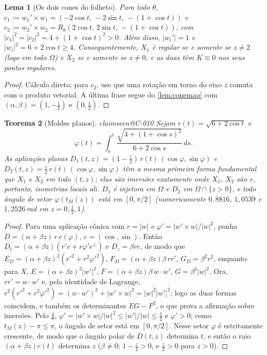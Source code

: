 \documentclass[11pt,a4paper]{article}
\makeatletter
\theoremstyle{plain}
\newtheorem{theorem}{Teorema}[section]
\newtheorem{lemma}[theorem]{Lema}
\theoremstyle{remark}
\newcommand{\claim}[1]{\ifcsname claimseen@#1\endcsname\else\expandafter\gdef\csname claimseen@#1\endcsname{}\label{claim:#1}\fi}
\makeatother
\begin{document}
\begin{lemma}[Os dois cones do folheto]\label{lem:leafcones}
Para todo $\theta$, $c_1:=w_1'\times w_1=(-2\cos t,\,-2\sin t,\,-(1+\cos t))$ e
$c_2:=w_2'\times w_2=R_\theta(2\cos t,\,2\sin t,\,-(1+\cos t))$, com $|c_1|^2=|c_2|^2=4+(1+\cos t)^2>0$. Além disso,
$|w_i'|=1$ e $|w_i|^2=6+2\cos t\ge4$. Consequentemente, $X_1$ é regular se e somente se $z\ne2$ (logo em todo $\Omega$) e $X_2$
se e somente se $z\ne0$, e as duas têm $K\equiv0$ nos seus pontos regulares.
\end{lemma}
\begin{proof}
Cálculo direto; para $c_2$, use que uma rotação em torno do eixo $z$ comuta com o produto vetorial. A última frase segue do
\cref{lem:conemap} com $(\alpha,\beta)=(1,-\frac12)$ e $(0,\frac12)$.
\end{proof}

\begin{theorem}[Moldes planos]\label{thm:flat}\claim{C-010}
Sejam $r(t)=\sqrt{6+2\cos t}$ e
\[ \varphi(t)=\int_\pi^t\frac{\sqrt{4+(1+\cos s)^2}}{6+2\cos s}\,ds. \]
As aplicações planas $D_1(t,z)=(1-\tfrac z2)\,r(t)\,(\cos\varphi,\sin\varphi)$ e $D_2(t,z)=\tfrac z2\,r(t)\,(\cos\varphi,\sin\varphi)$
têm a mesma primeira forma fundamental que $X_1$ e $X_2$ em todo $(t,z)$; elas são imersões exatamente onde $X_1$, $X_2$ são
e, portanto, isometrias locais ali. $D_1$ é injetora em $\Omega$ e $D_2$ em $\Omega\cap\{z>0\}$, e todo ângulo de setor
$\varphi(t_M(z))$ está em $[0,\pi/2]$ (numericamente $0{,}8816$, $1{,}0539$ e $1{,}2526$\,rad em $z=0,\tfrac12,1$).
\end{theorem}
\begin{proof}
Para uma aplicação cônica com $r=|w|$ e $\varphi'=|w'\times w|/|w|^2$, ponha $D=(\alpha+\beta z)\,r\,e(\varphi)$,
$e=(\cos,\sin)$. Então $D_t=(\alpha+\beta z)(r'e+r\varphi'e^\perp)$ e $D_z=\beta r e$, de modo que
$E_D=(\alpha+\beta z)^2(r'^2+r^2\varphi'^2)$, $F_D=(\alpha+\beta z)\beta\,rr'$, $G_D=\beta^2r^2$, enquanto para $X$,
$E=(\alpha+\beta z)^2|w'|^2$, $F=(\alpha+\beta z)\beta\,w\cdot w'$, $G=\beta^2|w|^2$. Ora, $rr'=w\cdot w'$ e, pela identidade de
Lagrange, $r^2(r'^2+r^2\varphi'^2)=(w\cdot w')^2+|w'\times w|^2=|w|^2|w'|^2$; logo as duas formas coincidem, e também os
determinantes $EG-F^2$, o que prova a afirmação sobre imersões. Pelo \cref{lem:leafcones},
$\varphi'=|w'\times w|/|w|^2\le |w'|/|w|\le\frac12$ e $\varphi'>0$; como $t_M(z)-\pi\le\pi$, o ângulo de setor está em
$[0,\pi/2]$. Nesse setor $\varphi$ é estritamente crescente, de modo que o ângulo polar de $D(t,z)$ determina $t$, e então o
raio $(\alpha+\beta z)r(t)$ determina $z$ ($\beta\ne0$; $1-\frac z2>0$, e $\frac z2>0$ para $z>0$).
\end{proof}
\end{document}
